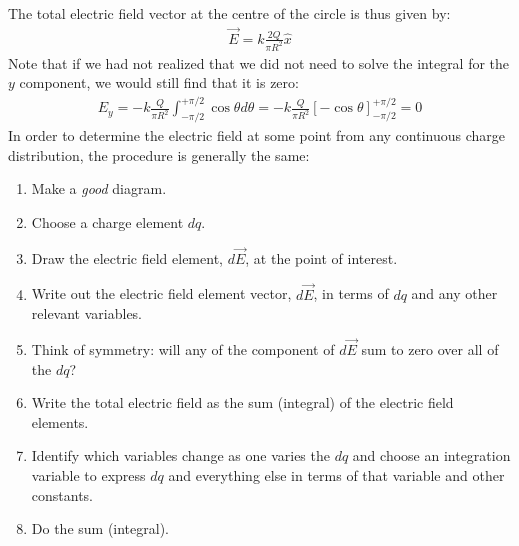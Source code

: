 The total electric field vector at the centre of the circle is thus given by:
\begin{align*}
\vec E = k\frac{2Q}{\pi R^2} \hat x
\end{align*}
Note that if we had not realized that we did not need to solve the integral for the $y$ component, we would still find that it is zero:
\begin{align*}
E_y= -k\frac{Q}{\pi R^2}\int_{-\pi/2}^{+\pi/2}\cos\theta d\theta=-k\frac{Q}{\pi R^2}\left[ -\cos\theta \right]_{-\pi/2}^{+\pi/2}=0
\end{align*}
In order to determine the electric field at some point from any continuous charge distribution, the procedure is generally the same:
\begin{enumerate}
\item Make a \textit{good} diagram.
\item Choose a charge element $dq$.
\item Draw the electric field element, $d\vec E$, at the point of interest.
\item Write out the electric field element vector, $d\vec E$, in terms of $dq$ and any other relevant variables.
\item Think of symmetry: will any of the component of $d\vec E$ sum to zero over all of the $dq$?
\item Write the total electric field as the sum (integral) of the electric field elements.
\item Identify which variables change as one varies the $dq$ and choose an integration variable to express $dq$ and everything else in terms of that variable and other constants.
\item Do the sum (integral).
\end{enumerate}

